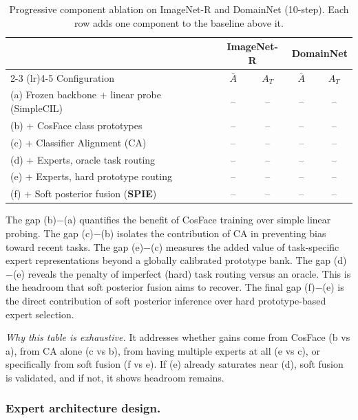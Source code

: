\begin{table}[t]
\centering
\caption{Progressive component ablation on ImageNet-R and DomainNet (10-step). Each row adds one component to the baseline above it.}
\label{tab:component_ablation}
\small
\begin{tabular}{lcccc}
\toprule
& \multicolumn{2}{c}{ImageNet-R} & \multicolumn{2}{c}{DomainNet} \\
\cmidrule(lr){2-3} \cmidrule(lr){4-5}
Configuration & $\bar{A}$ & $A_T$ & $\bar{A}$ & $A_T$ \\
\midrule
(a) Frozen backbone + linear probe (SimpleCIL)      & -- & -- & -- & -- \\
 (b) + CosFace class prototypes & -- & -- & -- & -- \\
(c) + Classifier Alignment (CA)                        & -- & -- & -- & -- \\
(d) + Experts, oracle task routing                    & -- & -- & -- & -- \\
(e) + Experts, hard prototype routing                  & -- & -- & -- & -- \\
(f) + Soft posterior fusion \hfill (\textbf{SPIE})    & -- & -- & -- & -- \\
\bottomrule
\end{tabular}
\end{table}

The gap (b)$-$(a) quantifies the benefit of CosFace training over simple linear probing. The gap (c)$-$(b) isolates the contribution of CA in preventing bias toward recent tasks. The gap (e)$-$(c) measures the added value of task-specific expert representations beyond a globally calibrated prototype bank. The gap (d)$-$(e) reveals the penalty of imperfect (hard) task routing versus an oracle. This is the headroom that soft posterior fusion aims to recover. The final gap (f)$-$(e) is the direct contribution of soft posterior inference over hard prototype-based expert selection.

\noindent\textit{Why this table is exhaustive.} It addresses whether gains come from CosFace (b vs a), from CA alone (c vs b), from having multiple experts at all (e vs c), or specifically from soft fusion (f vs e). If (e) already saturates near (d), soft fusion is validated, and if not, it shows headroom remains.

\subsubsection{Expert architecture design.}

